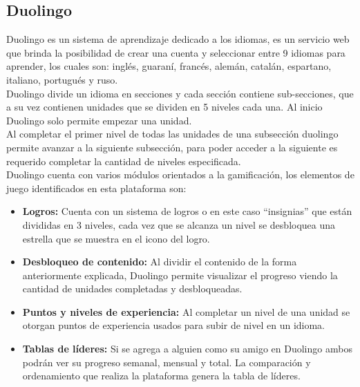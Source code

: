 \begin{multicols*}{2}
\subsection{Duolingo}

 Duolingo \cite{PagDuolingo} es un sistema de aprendizaje dedicado a los idiomas, es un servicio web que
 brinda la posibilidad de crear una cuenta y seleccionar entre 9 idiomas para aprender,
 los cuales son: inglés, guaraní, francés, alemán, catalán, espartano, italiano, portugués y ruso.\\

 \noindent Duolingo divide un idioma en secciones y cada sección contiene sub-secciones,
 que a su vez contienen unidades que se dividen en 5 niveles cada una. Al inicio Duolingo
 solo permite empezar una unidad.\\

 \noindent Al completar el primer nivel de todas las unidades de una subsección
 duolingo permite avanzar a la siguiente subsección, para poder acceder a la
 siguiente es requerido completar la cantidad de niveles especificada.\\

 \noindent Duolingo cuenta con varios módulos orientados a la gamificación, los elementos
 de juego identificados en esta plataforma son:

    \begin{itemize}
    \item {\bf Logros:} Cuenta con un sistema de logros o en este caso ``insignias''
        que están divididas en 3 niveles, cada vez que se alcanza un nivel se
        desbloquea una estrella que se muestra en el icono del logro.

    \item {\bf Desbloqueo de contenido:} Al dividir el contenido de la forma
        anteriormente explicada, Duolingo permite visualizar el progreso viendo
        la cantidad de unidades completadas y desbloqueadas.

    \item {\bf Puntos y niveles de experiencia:} Al completar un nivel de una unidad
        se otorgan puntos de experiencia usados para subir de nivel en un idioma.

    \item {\bf Tablas de líderes:} Si se agrega a alguien como su amigo en Duolingo ambos
        podrán ver su progreso semanal, mensual y total. La comparación y ordenamiento
        que realiza la plataforma genera la tabla de líderes.


\end{itemize}
\end{multicols*}
